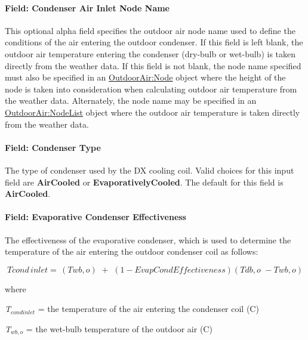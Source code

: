 \paragraph{Field: Condenser Air Inlet Node Name}\label{field-condenser-air-inlet-node-name}

This optional alpha field specifies the outdoor air node name used to define the conditions of the air entering the outdoor condenser. If this field is left blank, the outdoor air temperature entering the condenser (dry-bulb or wet-bulb) is taken directly from the weather data. If this field is not blank, the node name specified must also be specified in an \hyperref[outdoorairnode]{OutdoorAir:Node} object where the height of the node is taken into consideration when calculating outdoor air temperature from the weather data. Alternately, the node name may be specified in an \hyperref[outdoorairnodelist]{OutdoorAir:NodeList} object where the outdoor air temperature is taken directly from the weather data.

\paragraph{Field: Condenser Type}\label{field-condenser-type}

The type of condenser used by the DX cooling coil. Valid choices for this input field are \textbf{AirCooled} or \textbf{EvaporativelyCooled}. The default for this field is \textbf{AirCooled}.

\paragraph{Field: Evaporative Condenser Effectiveness}\label{field-evaporative-condenser-effectiveness}

The effectiveness of the evaporative condenser, which is used to determine the temperature of the air entering the outdoor condenser coil as follows:

\begin{equation}
Tcond\,inlet = \,\left( {Twb,o} \right)\,\, + \,\,\left( {1 - EvapCondEffectiveness} \right)\left( {Tdb,o\,\, - Twb,o} \right)
\end{equation}

where

\emph{T\(_{cond inlet}\)} = the temperature of the air entering the condenser coil (C)

\emph{T\(_{wb,o}\)} = the wet-bulb temperature of the outdoor air (C)

